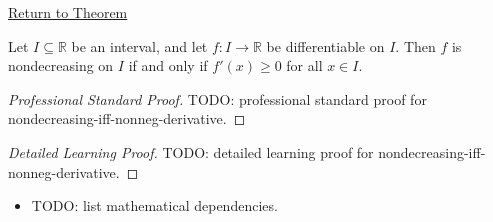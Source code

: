 \newpage
{}
\label{prf:nondecreasing-iff-nonneg-derivative}

\begin{remark*}[Return]
\hyperref[thm:nondecreasing-iff-nonneg-derivative]{Return to Theorem}
\end{remark*}

\begin{theorem*}
Let $I \subseteq \mathbb{R}$ be an interval, and let $f : I \to \mathbb{R}$ be differentiable on $I$. Then $f$ is nondecreasing on $I$ if and only if $f'(x) \geq 0$ for all $x \in I$.
\end{theorem*}

\begin{proof}[Professional Standard Proof]
\LRAProofBodyStart
TODO: professional standard proof for nondecreasing-iff-nonneg-derivative.
\end{proof}

\begin{proof}[Detailed Learning Proof]
\LRAProofBodyStart
TODO: detailed learning proof for nondecreasing-iff-nonneg-derivative.
\end{proof}

\begin{remark*}
\end{remark*}

\begin{dependencies}
\begin{itemize}
  \item TODO: list mathematical dependencies.
\end{itemize}
\end{dependencies}

\clearpage
